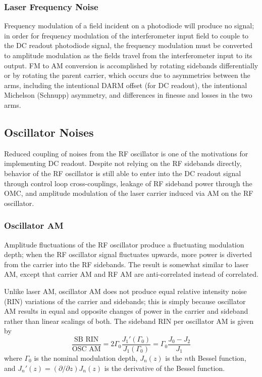 \subsubsection{Laser Frequency Noise}

Frequency modulation of a field incident on a photodiode will produce
no signal; in order for frequency modulation of the interferometer
input field to couple to the DC readout photodiode signal, the
frequency modulation must be converted to amplitude modulation as the
fields travel from the interferometer input to its output.  FM to AM
conversion is accomplished by rotating sidebands differentially or by
rotating the parent carrier, which occurs due to asymmetries between
the arms, including the intentional DARM offset (for DC readout), the
intentional Michelson (Schnupp) asymmetry, and differences in finesse
and losses in the two arms.

\subsection{Oscillator Noises}

Reduced coupling of noises from the RF oscillator is one of the
motivations for implementing DC readout. Despite not relying on the RF
sidebands directly, behavior of the RF oscillator is still able to
enter into the DC readout signal through control loop cross-couplings,
leakage of RF sideband power through the OMC, and amplitude modulation
of the laser carrier induced via AM on the RF oscillator.

\subsubsection{Oscillator AM}

Amplitude fluctuations of the RF oscillator produce a fluctuating modulation
depth; when the RF oscillator signal fluctuates upwards, more power is diverted
from the carrier into the RF sidebands.  The result is somewhat similar to laser
AM, except that carrier AM and RF AM are anti-correlated instead of correlated.

Unlike laser AM, oscillator AM does not produce equal relative intensity noise
(RIN) variations of the carrier and sidebands; this is simply because oscillator
AM results in equal and opposite changes of power in the carrier and sideband
rather than linear scalings of both.  The sideband RIN per oscillator AM is
given by
\begin{equation}
\frac{\text{SB RIN}}{\text{OSC AM}}=2\Gamma_{0}\frac{J_{1}'(\Gamma_{0})}{J_{1}(\Gamma_{0})}=\Gamma_{0}\frac{J_{0}-J_{2}}{J_{1}}
\end{equation}
where $\Gamma_0$ is the nominal modulation depth, $J_n(z)$ is the $n$th Bessel
function, and $J_n'(z)=(\partial/\partial z)J_n(z)$ is the derivative of the Bessel function.

